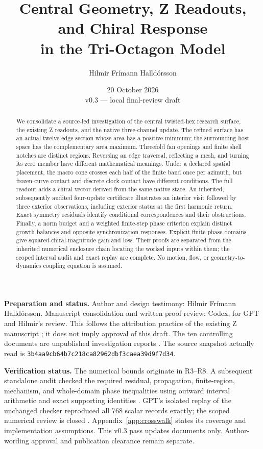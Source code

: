 \documentclass[11pt,a4paper]{article}
\title{Central Geometry, Z Readouts, and Chiral Response\\
in the Tri-Octagon Model}
\author{Hilmir Frímann Halldórsson}
\date{20 October 2026\\[4pt]\large v0.3 --- local final-review draft}
\numberwithin{equation}{section}
\begin{document}
\maketitle
\begin{abstract}
We consolidate a source-led investigation of the central twisted-hex research
surface, the existing Z readouts, and the native three-channel update. The
refined surface has an actual twelve-edge section whose area has a positive
minimum; the surrounding host space has the complementary area maximum.
Threefold fan openings and finite shell notches are distinct regions. Reversing
an edge traversal, reflecting a mesh, and turning its zero member have different
mathematical meanings. Under a declared spatial placement, the macro cone
crosses each half of the finite band once per azimuth, but frozen-curve contact
and discrete clock contact have different conditions. The full readout adds a
chiral vector derived from the same native state. An inherited, subsequently
audited four-update certificate illustrates an interior visit followed by three exterior observations,
including exterior status at the first harmonic return. Exact symmetry residuals
identify conditional correspondences and their obstructions. Finally, a norm
budget and a weighted finite-step phase criterion explain distinct growth
balances and opposite synchronization responses. Explicit finite phase domains
give squared-chiral-magnitude gain and loss. Their proofs are separated from the
inherited numerical enclosure chain locating the worked inputs within them;
the scoped interval audit and exact replay are complete.
No motion, flow, or geometry-to-dynamics coupling equation is assumed.
\end{abstract}

\vspace{4pt}
\textbf{Preparation and status.} Author and design testimony: Hilmir Frímann
Halldórsson. Manuscript consolidation and written proof review: Codex, for GPT
and Hilmir's review. This follows the attribution practice of the existing
Z manuscript \cite{PaperE}; it does not imply approval of this draft.
The ten controlling documents are unpublished investigation reports
\cite{R0,R1,R2,R3,R4,R5,R6,R7,R8,R9}. The source snapshot actually read is
\texttt{3b4aa9cb64b7c218ca82962dbf3caea39d9f7d34}.

\textbf{Verification status.} The numerical bounds originate in R3--R8.
A subsequent standalone audit checked the required residual, propagation,
finite-region, mechanism, and whole-domain phase inequalities using outward
interval arithmetic and exact supporting identities \cite{Audit}.
GPT's isolated replay of the unchanged checker reproduced all 768 scalar
records exactly; the scoped numerical review is closed \cite{GPTAudit}.
Appendix~\ref{app:crosswalk} states its coverage and implementation assumptions.
This v0.3 pass updates documents only. Author-wording approval and publication
clearance remain separate.
\end{document}
